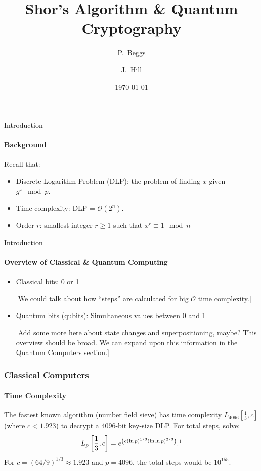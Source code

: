\documentclass{beamer}
\title{Shor's Algorithm \& Quantum Cryptography}
\author[Beggs, Hill] %
{P.~Beggs \and J.~Hill}
\institute%
{
  Department of Mathematics and Computer Science\\
  Hendrix College}
\date{\today}
\begin{document}
\begin{frame}
    \titlepage
\end{frame}



\begin{frame}{Introduction}
	\framesubtitle{Background}
		Recall that:
		\pause
		\begin{itemize}
		\item Discrete Logarithm Problem (DLP): the problem of finding \(x\) given \(g^x\mod p\).
		\pause
		\item Time complexity: DLP = \(\mathcal{O}(2^{n})\).
		\pause
		\item Order \(r\): smallest integer \(r \geq 1\) such that \(x^r \equiv 1 \mod n\)
	\end{itemize}
\end{frame}




\begin{frame}{Introduction}
	\framesubtitle{Overview of Classical \& Quantum Computing}
    \begin{itemize}
        \item Classical bits: 0 or 1
        \item[] [We could talk about how ``steps'' are calculated for big \(\mathcal{O}\) time complexity.]
        \item Quantum bits (qubits): Simultaneous values between 0 and 1
        \item[] [Add some more here about state changes and superpositioning, maybe? This overview should be broad. We can expand upon this information in the Quantum Computers section.]
    \end{itemize}
\end{frame}




\begin{frame}
	\frametitle{Classical Computers}
	\framesubtitle{Time Complexity}
	The fastest known algorithm (number field sieve) has time complexity \(L_{4096}[\frac{1}{3},c]\) (where \(c < 1.923\)) to decrypt a 4096-bit key-size DLP.
	For total steps, solve:
	\[
		L_{p}\left[\frac{1}{3},c\right] = e^{\left(c(\ln p)^{1/3}(\ln\ln p)^{2/3}\right)}.\footnote{Menezes, A. J., Van Oorschot, P. C., \& Vanstone, S. A. (2018). \textit{Handbook of applied cryptography.} CRC press.
		}
	\]
	\pause
	For \(c = (64/9)^{1/3} \approx 1.923\) and \(p = 4096\), the total steps would be \(10^{155}\). 
\end{frame}
\end{document}
